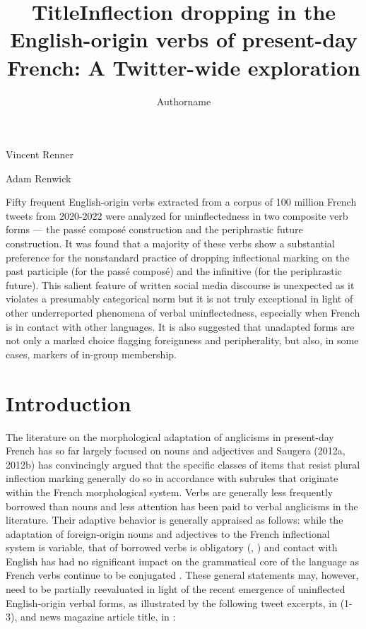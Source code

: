 \documentclass[output=paper]{langscibook}
\author{Authorname\orcid{}\affiliation{}}
\title{Title}
\begin{document}
\maketitle 

\title{Inflection dropping in the English-origin verbs of present-day French: A Twitter-wide exploration}

Vincent Renner

Adam Renwick

\begin{stylelsAbstract}
Fifty frequent English-origin verbs extracted from a corpus of 100 million French tweets from 2020-2022 were analyzed for uninflectedness in two composite verb forms — the \textup{passé composé} construction and the periphrastic future construction. It was found that a majority of these verbs show a substantial preference for the nonstandard practice of dropping inflectional marking on the past participle (for the \textup{passé composé}) and the infinitive (for the periphrastic future). This salient feature of written social media discourse is unexpected as it violates a presumably categorical norm but it is not truly exceptional in light of other underreported phenomena of verbal uninflectedness, especially when French is in contact with other languages. It is also suggested that unadapted forms are not only a marked choice flagging foreignness and peripherality, but also, in some cases, markers of in-group membership.
\end{stylelsAbstract}

\section{Introduction}

The literature on the morphological adaptation of anglicisms in present-day French has so far largely focused on nouns and adjectives and Saugera (2012a, 2012b) has convincingly argued that the specific classes of items that resist plural inflection marking generally do so in accordance with subrules that originate within the French morphological system. Verbs are generally less frequently borrowed than nouns \citep{Tadmor2009} and less attention has been paid to verbal anglicisms in the literature. Their adaptive behavior is generally appraised as follows: while the adaptation of foreign-origin nouns and adjectives to the French inflectional system is variable, that of borrowed verbs is obligatory (\citealt{Anastassiadis-SyméonidisNikolaou2011}, \citealt{Poplack2017}) and contact with English has had no significant impact on the grammatical core of the language as French verbs continue to be conjugated \citep{Saulière2014}. These general statements may, however, need to be partially reevaluated in light of the recent emergence of uninflected English-origin verbal forms, as illustrated by the following tweet excerpts, in (1-3), and news magazine article title, in :
\end{document}
